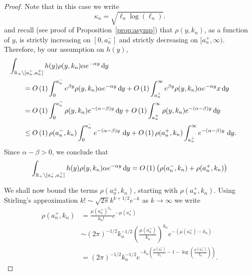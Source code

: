 \begin{proof}



Note that in this case we write
\[
	\kappa_n = \sqrt{\ell_n \log(\ell_n)}.
\]
and recall (see proof of Proposition~\ref{prop:asymp}) that $\rho(y,k_n)$, as a function of $y$, is strictly increasing on $[0,a_n^-]$ and strictly decreasing on $[a_n^+,\infty)$. Therefore, by our assumption on $h(y)$,
\begin{align*}
	&\hspace{-20pt}\int_{\R_+ \setminus [a_n^-, a_n^+]} h(y) \rho(y,k_n) 
		\alpha e^{-\alpha y} \dd y\\
    &= \bigO{1} \int_0^{a_n^-} e^{\beta y} \rho(y,k_n) \alpha e^{-\alpha y} \dd y 
    	+ \bigO{1}\int_{a_n^+}^{\infty} e^{\beta y} \rho(y,k_n) \alpha e^{-\alpha y}x \dd y \\
    &= \bigO{1} \int_0^{a_n^-} \rho(y,k_n) e^{-(\alpha-\beta) y} \dd y 
   		+ \bigO{1} \int_{a_n^+}^{\infty} \rho(y,k_n) e^{-(\alpha-\beta) y} \dd y\\
   	&\le \bigO{1}\rho(a_n^-,k_n)\int_0^{a_n^-} e^{-(\alpha-\beta) y} \, \dd y
   		+ \bigO{1} \rho(a_n^+,k_n) \int_{a_n^+}^{\infty} e^{-(\alpha-\beta) y} \, \dd y.
\end{align*}
Since $\alpha - \beta > 0$, we conclude that
\begin{equation}\label{eq:concentration_lemma_integral_bound}
	\int_{{\mathbb R}_+ \setminus [a_n^-, a_n^+]} h(y) \rho(y,k_n) \alpha e^{-\alpha y} \operatorname{\mathrm{d}\hspace{-2pt}} y
	= O\left(1\right) \left(\rho(a_n^-,k_n) + \rho(a_n^+,k_n)\right) 
\end{equation}

We shall now bound the terms $\rho(a_n^\pm,k_n)$, starting with $\rho(a_n^+,k_n)$.  Using Stirling's approximation $k! \sim \sqrt{2\pi} k^{k + 1/2} e^{-k}$ as $k \to \infty$ we write
\begin{align*}
	\rho(a_n^+,k_n) &= \frac{\mu(a_n^+)^{k_n}}{k_n!} e^{-\mu(a_n^+)} \\
	&\sim (2\pi)^{-1/2} k_n^{-1/2} \left(\frac{\mu(a_n^+)}{k_n}\right)^{k_n} e^{-(\mu(a_n^+) - k_n)}\\
	&= (2\pi)^{-1/2} k_n^{-1/2} 
		e^{-k_n\left(\frac{\mu(a_n^+)}{k_n} - 1 - \log\left(\frac{\mu(a_n^+)}{k_n}\right)\right)}.
\end{align*}


\end{proof}
